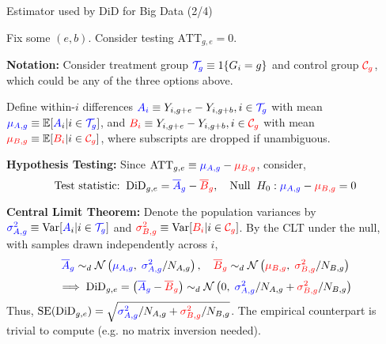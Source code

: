 \documentclass[usenames,dvipsnames]{beamer}
\begin{document}
\begin{frame}{Estimator used by DiD for Big Data (2/4)}

Fix some $(e,b)$. Consider testing $\text{ATT}_{g,e} =0$.

\textbf{Notation:} Consider treatment group ${\color{blue}\mathcal{T}_g} \equiv 1\{G_i =g\}$ and control group ${\color{red}\mathcal{C}_g}$, which could be any of the three options above.  

Define within-$i$ differences ${\color{blue}A_{i}} \equiv Y_{i,g+e} - Y_{i,g+b}, i\in{\color{blue}\mathcal{T}_g}$ with mean ${\color{blue}\mu_{A,g}}\equiv \mathbb{E}[{\color{blue}A}_{i} | i \in {\color{blue}\mathcal{T}_{g}} ]$, and ${\color{red}B_{i}} \equiv Y_{i,g+e} - Y_{i,g+b}, i\in{\color{red}\mathcal{C}_g}$ with mean ${\color{red}\mu_{B,g}} \equiv \mathbb{E}[{\color{red}B_i} |  i\in{\color{red}\mathcal{C}_g}]$, where subscripts are dropped if unambiguous.

\textbf{Hypothesis Testing:}  Since $\text{ATT}_{g,e} \equiv {\color{blue}\mu_{A,g}} - {\color{red}\mu_{B,g}}$, consider,
\vspace{-0.03cm}
\begin{equation} \notag
\text{Test statistic:} \;\; \text{DiD}_{g,e} = {\color{blue}\overline{A}_g} - {\color{red}\overline{B}_g} , \quad \text{Null} \;\; H_0:   {\color{blue}\mu_{A,g}} - {\color{red}\mu_{B,g}} = 0
\end{equation}


\vspace{-0.12cm}

\textbf{Central Limit Theorem:} Denote the population variances by ${\color{blue}\sigma^2_{A,g}}\equiv \text{Var}[{\color{blue}A}_{i} | i \in {\color{blue}\mathcal{T}_g} ]$ and ${\color{red}\sigma^2_{B,g}} \equiv \text{Var}[{\color{red}B_i} |  i\in{\color{red}\mathcal{C}_g}]$. By the CLT under the null, with samples  drawn independently across $i$,  
\vspace{-0.03cm}
\begin{equation} \notag
 {\color{blue}\overline{A}_g} \sim_d \mathcal{N}\left( {\color{blue}\mu_{A,g}} , \; {\color{blue}\sigma^2_{A,g}}/N_{A,g} \right), \quad  {\color{red}\overline{B}_g} \sim_d \mathcal{N}\left( {\color{red}\mu_{B,g}} , \; {\color{red}\sigma^2_{B,g}}/N_{B,g} \right) 
\end{equation}
\begin{equation} \notag
\implies  \text{DiD}_{g,e} = \left(  {\color{blue}\overline{A}_g} - {\color{red}\overline{B}_g} \right) \sim_d  \mathcal{N}\left( 0 , \;  {\color{blue}\sigma^2_{A,g}}/N_{A,g}  + {\color{red}\sigma^2_{B,g}}/N_{B,g}   \right)
\end{equation}
Thus,  $\text{SE}(\text{DiD}_{g,e}) = \sqrt{{\color{blue}\sigma^2_{A,g}}/N_{A,g}  + {\color{red}\sigma^2_{B,g}}/N_{B,g}  }$. The empirical counterpart is trivial to compute (e.g. no matrix inversion needed).

 
\end{frame}
\end{document}
